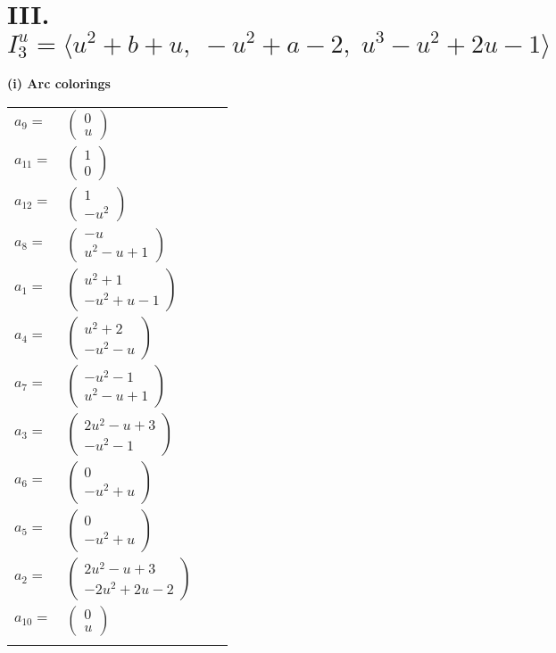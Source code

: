 \documentclass[1p]{elsarticle_modified}
\theoremstyle{definition}
\begin{document}
\centering \section*{III. $I^u_{3}= \langle u^2+b+u,\;- u^2+a-2,\;u^3- u^2+2 u-1 \rangle$}
\flushleft \textbf{(i) Arc colorings}\\
\begin{tabular}{m{7pt} m{180pt} m{7pt} m{180pt} }
\flushright $a_{9}=$&$\begin{pmatrix}0\\u\end{pmatrix}$ \\
\flushright $a_{11}=$&$\begin{pmatrix}1\\0\end{pmatrix}$ \\
\flushright $a_{12}=$&$\begin{pmatrix}1\\- u^2\end{pmatrix}$ \\
\flushright $a_{8}=$&$\begin{pmatrix}- u\\u^2- u+1\end{pmatrix}$ \\
\flushright $a_{1}=$&$\begin{pmatrix}u^2+1\\- u^2+u-1\end{pmatrix}$ \\
\flushright $a_{4}=$&$\begin{pmatrix}u^2+2\\- u^2- u\end{pmatrix}$ \\
\flushright $a_{7}=$&$\begin{pmatrix}- u^2-1\\u^2- u+1\end{pmatrix}$ \\
\flushright $a_{3}=$&$\begin{pmatrix}2 u^2- u+3\\- u^2-1\end{pmatrix}$ \\
\flushright $a_{6}=$&$\begin{pmatrix}0\\- u^2+u\end{pmatrix}$ \\
\flushright $a_{5}=$&$\begin{pmatrix}0\\- u^2+u\end{pmatrix}$ \\
\flushright $a_{2}=$&$\begin{pmatrix}2 u^2- u+3\\-2 u^2+2 u-2\end{pmatrix}$ \\
\flushright $a_{10}=$&$\begin{pmatrix}0\\u\end{pmatrix}$\\&\end{tabular}
\end{document}
